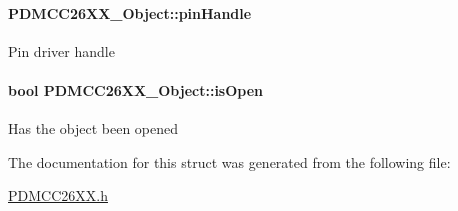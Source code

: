 \paragraph[{pin\+Handle}]{ P\+D\+M\+C\+C26\+X\+X\+\_\+\+Object\+::pin\+Handle}\label{struct_p_d_m_c_c26_x_x___object_a66ad6778e6bfacee79397bf1d44f09fd}
Pin driver handle 
\paragraph[{is\+Open}]{\setlength{\rightskip}{0pt plus 5cm}bool P\+D\+M\+C\+C26\+X\+X\+\_\+\+Object\+::is\+Open}\label{struct_p_d_m_c_c26_x_x___object_ac89b6cf6088d05b4f52087e67e6bba0e}
Has the object been opened 

The documentation for this struct was generated from the following file\+:\begin{DoxyCompactItemize}
\item 
\hyperlink{_p_d_m_c_c26_x_x_8h}{P\+D\+M\+C\+C26\+X\+X.\+h}\end{DoxyCompactItemize}
